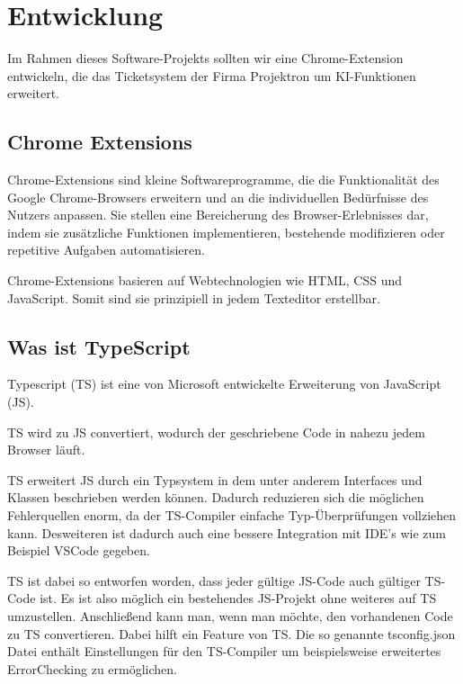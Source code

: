 \section{Entwicklung}

Im Rahmen dieses Software-Projekts sollten wir eine Chrome-Extension entwickeln, die das Ticketsystem der Firma Projektron um KI-Funktionen erweitert.

\subsection{Chrome Extensions}

Chrome-Extensions \cite{chrome-extensions} sind kleine Softwareprogramme, die die Funktionalität des Google Chrome-Browsers erweitern und an die individuellen Bedürfnisse des Nutzers anpassen. Sie stellen eine Bereicherung des Browser-Erlebnisses dar, indem sie zusätzliche Funktionen implementieren, bestehende modifizieren oder repetitive Aufgaben automatisieren.

Chrome-Extensions basieren auf Webtechnologien wie HTML, CSS und JavaScript. Somit sind sie prinzipiell in jedem Texteditor erstellbar.

\subsection{Was ist TypeScript}

Typescript (TS) ist eine von Microsoft entwickelte Erweiterung von JavaScript (JS). \cite{typescript}

TS wird zu JS convertiert, wodurch der geschriebene Code in nahezu jedem Browser läuft. \cite{typescript}

TS erweitert JS durch ein Typsystem in dem unter anderem Interfaces und Klassen beschrieben werden können. Dadurch reduzieren sich die möglichen Fehlerquellen enorm, da der TS-Compiler einfache Typ-Überprüfungen vollziehen kann. Desweiteren ist dadurch auch eine bessere Integration mit IDE's wie zum Beispiel VSCode gegeben. \cite{typescript}

TS ist dabei so entworfen worden, dass jeder gültige JS-Code auch gültiger TS-Code ist. Es ist also möglich ein bestehendes JS-Projekt ohne weiteres auf TS umzustellen. Anschließend kann man, wenn man möchte, den vorhandenen Code zu TS convertieren. \cite{typescript} \cite{ts-doku} Dabei hilft ein Feature von TS. Die so genannte tsconfig.json Datei enthält Einstellungen für den TS-Compiler um beispielsweise erweitertes ErrorChecking zu ermöglichen. \cite{tsconfig}

